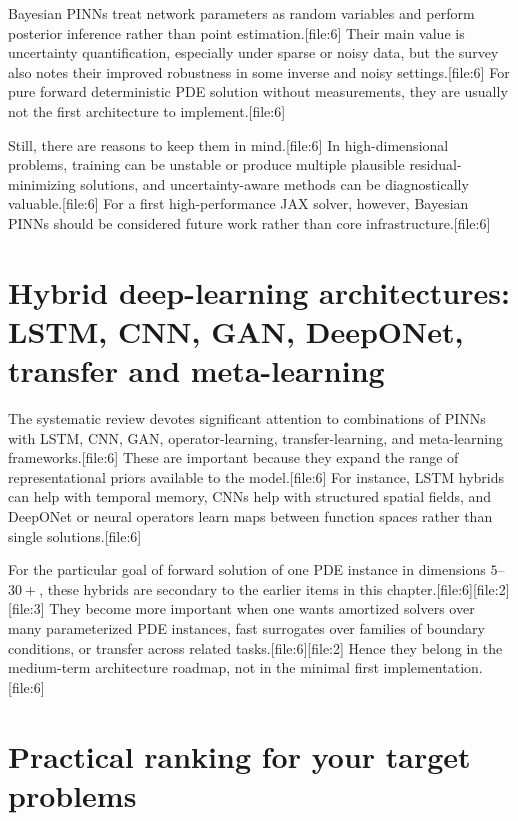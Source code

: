 \documentclass[11pt]{report}
\begin{document}
Bayesian PINNs treat network parameters as random variables and perform posterior inference rather than point estimation.[file:6]  
Their main value is uncertainty quantification, especially under sparse or noisy data, but the survey also notes their improved robustness in some inverse and noisy settings.[file:6]  
For pure forward deterministic PDE solution without measurements, they are usually not the first architecture to implement.[file:6]

Still, there are reasons to keep them in mind.[file:6]  
In high-dimensional problems, training can be unstable or produce multiple plausible residual-minimizing solutions, and uncertainty-aware methods can be diagnostically valuable.[file:6]  
For a first high-performance JAX solver, however, Bayesian PINNs should be considered future work rather than core infrastructure.[file:6]

\section{Hybrid deep-learning architectures: LSTM, CNN, GAN, DeepONet, transfer and meta-learning}

The systematic review devotes significant attention to combinations of PINNs with LSTM, CNN, GAN, operator-learning, transfer-learning, and meta-learning frameworks.[file:6]  
These are important because they expand the range of representational priors available to the model.[file:6]  
For instance, LSTM hybrids can help with temporal memory, CNNs help with structured spatial fields, and DeepONet or neural operators learn maps between function spaces rather than single solutions.[file:6]

For the particular goal of forward solution of one PDE instance in dimensions \(5\)–\(30+\), these hybrids are secondary to the earlier items in this chapter.[file:6][file:2][file:3]  
They become more important when one wants amortized solvers over many parameterized PDE instances, fast surrogates over families of boundary conditions, or transfer across related tasks.[file:6][file:2]  
Hence they belong in the medium-term architecture roadmap, not in the minimal first implementation.[file:6]

\section{Practical ranking for your target problems}
\end{document}

